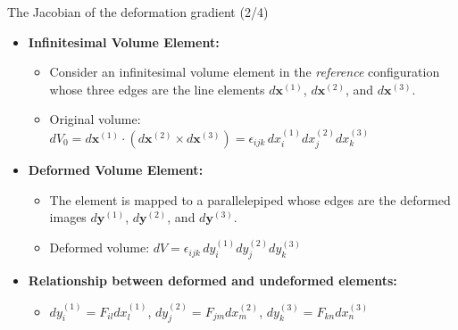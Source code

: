 \documentclass[aspectratio=169,11pt]{beamer}
\begin{document}
\begin{frame}{The Jacobian of the deformation gradient (2/4)}
\begin{itemize}
        \item \textbf{Infinitesimal Volume Element:}
        \begin{itemize}
            \item   Consider an infinitesimal volume element in the \emph{reference} configuration whose three edges are the line elements $d\mathbf{x}^{(1)}$, $d\mathbf{x}^{(2)}$, and $d\mathbf{x}^{(3)}$.
            \item   Original volume: $dV_0 = d\mathbf{x}^{(1)} \cdot (d\mathbf{x}^{(2)} \times d\mathbf{x}^{(3)}) = \epsilon_{ijk}\, dx^{(1)}_i dx^{(2)}_j dx^{(3)}_k$
        \end{itemize}
    \item \textbf{Deformed Volume Element:}
        \begin{itemize}
            \item   The element is mapped to a parallelepiped whose edges are the deformed images $d\mathbf{y}^{(1)}$, $d\mathbf{y}^{(2)}$, and $d\mathbf{y}^{(3)}$.
            \item   Deformed volume: $dV = \epsilon_{ijk}\, dy^{(1)}_i dy^{(2)}_j dy^{(3)}_k$
        \end{itemize}
    \item \textbf{Relationship between deformed and undeformed elements:}
         \begin{itemize}
            \item   $dy^{(1)}_i = F_{il} dx^{(1)}_l$,  $dy^{(2)}_j = F_{jm} dx^{(2)}_m$,  $dy^{(3)}_k = F_{kn} dx^{(3)}_n$
         \end{itemize}
\end{itemize}
\end{frame}
\end{document}
